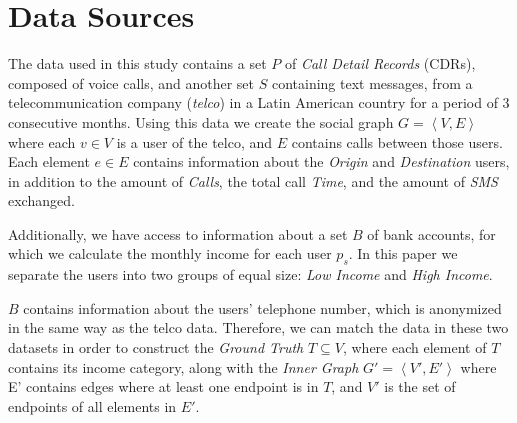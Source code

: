 
\section{Data Sources}
\label{sec:data_sources}

The data used in this study contains a set $P$ of \textit{Call Detail Records} (CDRs), composed of voice calls, and another set $S$ containing text messages, from a telecommunication company (\textit{telco}) in a Latin American country for a period of 3 consecutive months. Using this data we create the social graph $G = \left< V, E \right>$ where each $v \in V$ is a user of the telco, and $E$ contains calls between those users. Each element $e \in E$ contains information about the \emph{Origin} and \emph{Destination} users, in addition to the amount of \emph{Calls}, the total call \emph{Time}, and the amount of \emph{SMS} exchanged.

Additionally, we have access to information about a set $B$ of bank accounts, for which we calculate the monthly income for each user $p_s$. In this paper we separate the users into two groups of equal size: \emph{Low Income} and \emph{High Income}.

$B$ contains information about the users' telephone number, which is anonymized in the same way as the telco data.  Therefore, we can match the data in these two datasets in order to construct the \emph{Ground Truth} $T \subseteq V$, where each element of $T$ contains its income category, along with the \emph{Inner Graph} $G' = \left< V', E' \right>$ where E' contains edges where at least one endpoint is in $T$, and $V'$ is the set of endpoints of all elements in $E'$.
